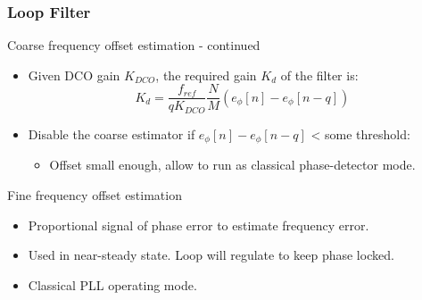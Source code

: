 \documentclass[t, screen, aspectratio=43]{beamer}
\begin{document}
\begin{frame}
	\frametitle{Loop Filter}
	\begin{block}{Coarse frequency offset estimation - continued}
		\begin{itemize}
			\footnotesize
			\item Given DCO gain $K_{DCO}$, the required gain $K_d$ of the filter is:
			\tiny
			\vspace{-0.5em}
			\begin{equation}
				K_{d} = \frac{f_{ref}}{qK_{DCO}}\frac{N}{M}\left( e_\phi[n]-e_\phi[n-q]\right )
			\end{equation}				
			\footnotesize	
			\item Disable the coarse estimator if $e_\phi[n]-e_\phi[n-q]$ < some threshold:
			\begin{itemize}
				\scriptsize
				\item Offset small enough, allow to run as classical phase-detector mode.
			\end{itemize}	
		\end{itemize} 
	\end{block}
	\begin{block}{Fine frequency offset estimation}
		\begin{itemize}
			\footnotesize
			\item Proportional signal of phase error to estimate frequency error.
			\item Used in near-steady state. Loop will regulate to keep phase locked.
			\item Classical PLL operating mode.
		\end{itemize} 	
	\end{block}
\end{frame}


\end{document}
